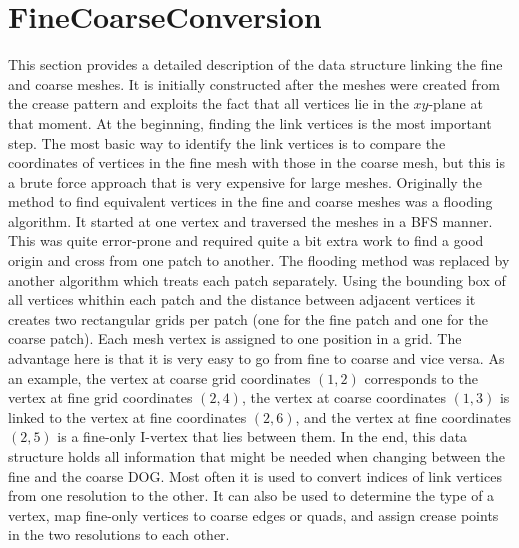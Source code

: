 \documentclass[a4paper,twoside,12pt,nochapterprefix]{scrbook}
\begin{document}
\section{FineCoarseConversion}\label{sec:conversion} %
This section provides a detailed description of the data structure linking the fine and coarse meshes. It is initially constructed after the meshes were created from the crease pattern and exploits the fact that all vertices lie in the $xy$-plane at that moment.\newline
At the beginning, finding the link vertices is the most important step. The most basic way to identify the link vertices is to compare the coordinates of vertices in the fine mesh with those in the coarse mesh, but this is a brute force approach that is very expensive for large meshes.\newline
Originally the method to find equivalent vertices in the fine and coarse meshes was a flooding algorithm. It started at one vertex and traversed the meshes in a BFS manner. This was quite error-prone and required quite a bit extra work to find a good origin and cross from one patch to another.\newline
The flooding method was replaced by another algorithm which treats each patch separately. Using the bounding box of all vertices whithin each patch and the distance between adjacent vertices it creates two rectangular grids per patch (one for the fine patch and one for the coarse patch). Each mesh vertex is assigned to one position in a grid. The advantage here is that it is very easy to go from fine to coarse and vice versa. As an example, the vertex at coarse grid coordinates $(1,2)$ corresponds to the vertex at fine grid coordinates $(2,4)$, the vertex at coarse coordinates $(1,3)$ is linked to the vertex at fine coordinates $(2,6)$, and the vertex at fine coordinates $(2,5)$ is a fine-only I-vertex that lies between them.\newline
In the end, this data structure holds all information that might be needed when changing between the fine and the coarse DOG. Most often it is used to convert indices of link vertices from one resolution to the other. It can also be used to determine the type of a vertex, map fine-only vertices to coarse edges or quads, and assign crease points in the two resolutions to each other.\newline
\end{document}
